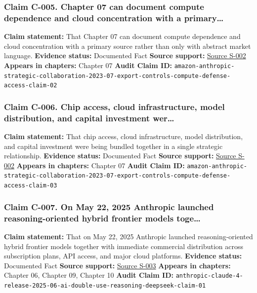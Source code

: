 \documentclass[
  american,
  11pt,
  letterpaper,
]{article}
\begin{document}
\subsubsection{Claim C-005. Chapter 07 can document compute dependence
and cloud concentration with a
primary\ldots{}}\label{claim-c-005-chapter-07-can-document-compute-dependence-and-cloud-concentration-with-a-primary}

\textbf{Claim statement:} That Chapter 07 can document compute
dependence and cloud concentration with a primary source rather than
only with abstract market language. \textbf{Evidence status:} Documented
Fact \textbf{Source support:}
\hyperref[source-s-002-amazon-and-anthropic-announce-strategic-collaboration-to-advance-generative-ai]{Source
S-002} \textbf{Appears in chapters:} Chapter 07 \textbf{Audit Claim ID:}
\texttt{amazon-anthropic-strategic-collaboration-2023-07-export-controls-compute-defense-access-claim-02}

\subsubsection{Claim C-006. Chip access, cloud infrastructure, model
distribution, and capital investment
wer\ldots{}}\label{claim-c-006-chip-access-cloud-infrastructure-model-distribution-and-capital-investment-wer}

\textbf{Claim statement:} That chip access, cloud infrastructure, model
distribution, and capital investment were being bundled together in a
single strategic relationship. \textbf{Evidence status:} Documented Fact
\textbf{Source support:}
\hyperref[source-s-002-amazon-and-anthropic-announce-strategic-collaboration-to-advance-generative-ai]{Source
S-002} \textbf{Appears in chapters:} Chapter 07 \textbf{Audit Claim ID:}
\texttt{amazon-anthropic-strategic-collaboration-2023-07-export-controls-compute-defense-access-claim-03}

\subsubsection{Claim C-007. On May 22, 2025 Anthropic launched
reasoning-oriented hybrid frontier models
toge\ldots{}}\label{claim-c-007-on-may-22-2025-anthropic-launched-reasoning-oriented-hybrid-frontier-models-toge}

\textbf{Claim statement:} That on May 22, 2025 Anthropic launched
reasoning-oriented hybrid frontier models together with immediate
commercial distribution across subscription plans, API access, and major
cloud platforms. \textbf{Evidence status:} Documented Fact
\textbf{Source support:}
\hyperref[source-s-003-introducing-claude-4]{Source S-003}
\textbf{Appears in chapters:} Chapter 06, Chapter 09, Chapter 10
\textbf{Audit Claim ID:}
\texttt{anthropic-claude-4-release-2025-06-ai-double-use-reasoning-deepseek-claim-01}
\end{document}
